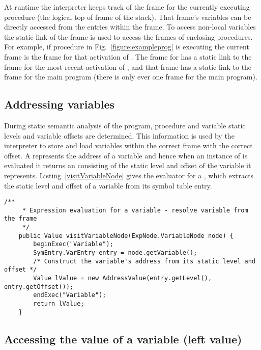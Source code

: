 \documentclass[a4paper,twoside]{article}
\begin{document}
At runtime the interpreter keeps track of the frame for the currently executing procedure
(the logical top of frame of the stack).
That frame's variables can be directly accessed from the entries within the frame.
To access non-local variables the static link of the frame is used to access the frames 
of enclosing procedures.
For example, if procedure  in Fig.~\ref{figure:exampleprog} is executing
the current frame is the frame for that activation of .
The frame for  has a static link to the frame for the most recent activation of ,
and that frame has a static link to the frame for the main program 
(there is only ever one frame for the main program).


\subsection{Addressing variables}

During static semantic analysis of the program, procedure and variable static levels
and variable offsets are determined.
This information is used by the interpreter to store and load variables within
the correct frame with the correct offset.
A  represents the address of a variable 
and hence when an instance of  is evaluated
it returns an  consisting of the static level and offset of the variable it represents.
Listing~\ref{visitVariableNode} gives the evaluator for a ,
which extracts the static level and offset of a variable from its symbol table entry.

\begin{figure*}[ht]
\begin{lstlisting}[caption=Evaluating a VariableNode to an AddressValue, label=visitVariableNode]
    /**
     * Expression evaluation for a variable - resolve variable from the frame
     */
    public Value visitVariableNode(ExpNode.VariableNode node) {
        beginExec("Variable");
        SymEntry.VarEntry entry = node.getVariable();
        /* Construct the variable's address from its static level and offset */
        Value lValue = new AddressValue(entry.getLevel(), entry.getOffset());
        endExec("Variable");
        return lValue;
    }
\end{lstlisting}
\end{figure*}


\subsection{Accessing the value of a variable (left value)}\label{section:lookup}
\end{document}
